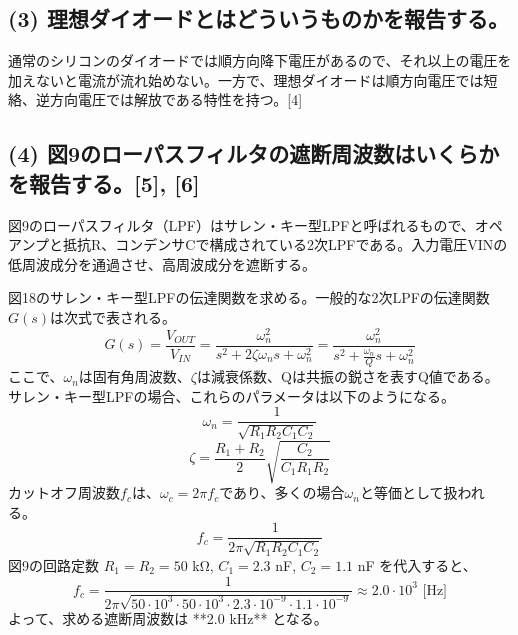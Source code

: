 \documentclass[
  a4paper,
  11pt,
]{ltjsarticle}
\begin{document}
\subsection{(3) 理想ダイオードとはどういうものかを報告する。}
通常のシリコンのダイオードでは順方向降下電圧があるので、それ以上の電圧を加えないと電流が流れ始めない。一方で、理想ダイオードは順方向電圧では短絡、逆方向電圧では解放である特性を持つ。[4]

\subsection{(4) 図9のローパスフィルタの遮断周波数はいくらかを報告する。[5], [6]}
図9のローパスフィルタ（LPF）はサレン・キー型LPFと呼ばれるもので、オペアンプと抵抗R、コンデンサCで構成されている2次LPFである。入力電圧VINの低周波成分を通過させ、高周波成分を遮断する。

図18のサレン・キー型LPFの伝達関数を求める。一般的な2次LPFの伝達関数$G(s)$は次式で表される。
\begin{equation}
  G(s) = \frac{V_{OUT}}{V_{IN}} = \frac{\omega_n^2}{s^2 + 2\zeta\omega_n s + \omega_n^2} = \frac{\omega_n^2}{s^2 + \frac{\omega_n}{Q}s + \omega_n^2} \label{eq:16}
\end{equation}
ここで、$\omega_n$は固有角周波数、$\zeta$は減衰係数、Qは共振の鋭さを表すQ値である。
サレン・キー型LPFの場合、これらのパラメータは以下のようになる。
\begin{equation}
  \omega_n = \frac{1}{\sqrt{R_1 R_2 C_1 C_2}} \label{eq:18}
\end{equation}
$$ \zeta = \frac{R_1+R_2}{2} \sqrt{\frac{C_2}{C_1 R_1 R_2}} $$
カットオフ周波数$f_c$は、$\omega_c = 2\pi f_c$であり、多くの場合$\omega_n$と等価として扱われる。
\begin{equation}
  f_c = \frac{1}{2\pi\sqrt{R_1 R_2 C_1 C_2}} \label{eq:19}
\end{equation}
図9の回路定数 $R_1=R_2=50$ \si{\kilo\ohm}, $C_1=2.3$ \si{\nano\farad}, $C_2=1.1$ \si{\nano\farad} を代入すると、
\begin{equation}
  f_c = \frac{1}{2\pi\sqrt{50 \cdot 10^3 \cdot 50 \cdot 10^3 \cdot 2.3 \cdot 10^{-9} \cdot 1.1 \cdot 10^{-9}}} \approx 2.0 \cdot 10^3 \text{ [Hz]} \label{eq:20}
\end{equation}
よって、求める遮断周波数は **2.0 kHz** となる。
\end{document}
